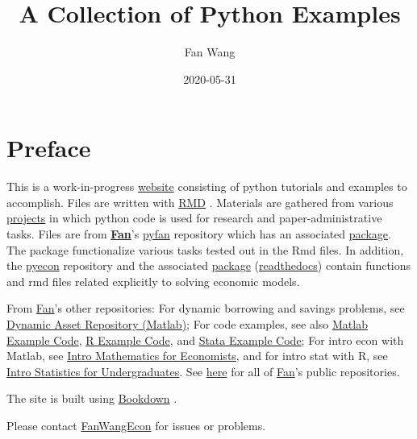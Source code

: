 \documentclass[
]{book}
\title{A Collection of Python Examples}
\author{Fan Wang}
\date{2020-05-31}
\begin{document}
\maketitle

{
\hypersetup{linkcolor=}
\setcounter{tocdepth}{2}
\tableofcontents
}
\hypertarget{preface}{%
\chapter*{Preface}\label{preface}}

This is a work-in-progress \href{https://fanwangecon.github.io/pyfan/}{website} consisting of python tutorials and examples to accomplish. Files are written with \href{https://rmarkdown.rstudio.com/}{RMD} \citep{R-rmarkdown}. Materials are gathered from various \href{https://fanwangecon.github.io/research}{projects} in which python code is used for research and paper-administrative tasks. Files are from \href{https://fanwangecon.github.io/}{\textbf{Fan}}'s \href{https://github.com/FanWangEcon/pyfan}{pyfan} repository which has an associated \href{https://pypi.org/project/pyfan/}{package}. The package functionalize various tasks tested out in the Rmd files. In addition, the \href{https://github.com/FanWangEcon/pyecon}{pyecon} repository and the associated \href{https://pypi.org/project/pyecon/}{package} (\href{https://pyfan.readthedocs.io/en/latest/autoapi/pyfan/index.html\#module-pyfan}{readthedocs}) contain functions and rmd files related explicitly to solving economic models.

From \href{https://fanwangecon.github.io/}{Fan}'s other repositories: For dynamic borrowing and savings problems, see \href{https://fanwangecon.github.io/CodeDynaAsset/}{Dynamic Asset Repository (Matlab)}; For code examples, see also \href{https://fanwangecon.github.io/M4Econ/}{Matlab Example Code}, \href{https://fanwangecon.github.io/R4Econ/}{R Example Code}, and \href{https://fanwangecon.github.io/Stata4Econ/}{Stata Example Code}; For intro econ with Matlab, see \href{https://fanwangecon.github.io/Math4Econ/}{Intro Mathematics for Economists}, and for intro stat with R, see \href{https://fanwangecon.github.io/Stat4Econ/}{Intro Statistics for Undergraduates}. See \href{https://github.com/FanWangEcon}{here} for all of \href{https://fanwangecon.github.io/}{Fan}'s public repositories.

The site is built using \href{https://bookdown.org/}{Bookdown} \citep{R-bookdown}.

Please contact \href{https://fanwangecon.github.io/}{FanWangEcon} for issues or problems.
\end{document}
